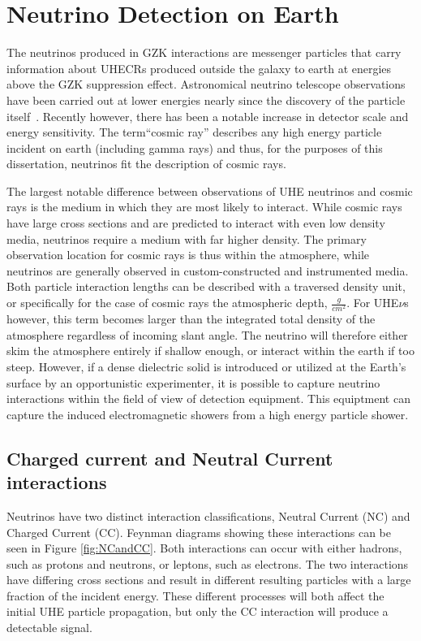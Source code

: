 \section{Neutrino Detection on Earth}
	The neutrinos produced in GZK interactions are messenger particles that carry information about UHECRs produced outside the galaxy to earth at energies above the GZK suppression effect.  Astronomical neutrino telescope observations have been carried out at lower energies nearly since the discovery of the particle itself~\cite{Homestake}. Recently however, there has been a notable increase in detector scale and energy sensitivity.  The term``cosmic ray'' describes any high energy particle incident on earth (including gamma rays) and thus, for the purposes of this dissertation, neutrinos fit the description of cosmic rays.
	
	The largest notable difference between observations of UHE neutrinos and cosmic rays is the medium in which they are most likely to interact.  While cosmic rays have large cross sections and are predicted to interact with even low density media, neutrinos require a medium with far higher density.  The primary observation location for cosmic rays is thus within the atmosphere, while neutrinos are generally observed in custom-constructed and instrumented media.  Both particle interaction lengths can be described with a traversed density unit, or specifically for the case of cosmic rays the atmospheric depth, $\frac{g}{cm^{2}}$.  For UHE$\nu$s however, this term becomes larger than the integrated total density of the atmosphere regardless of incoming slant angle.  The neutrino will therefore either skim the atmosphere entirely if shallow enough, or interact within the earth if too steep.  However, if a dense dielectric solid is introduced or utilized at the Earth's surface by an opportunistic experimenter, it is possible to capture neutrino interactions within the field of view of detection equipment.  This equiptment can capture the induced electromagnetic showers from a high energy particle shower.
	
	\subsection{Charged current and Neutral Current interactions} 
		Neutrinos have two distinct interaction classifications, Neutral Current (NC) and Charged Current (CC).  Feynman diagrams showing these interactions can be seen in Figure \ref{fig:NCandCC}.  Both interactions can occur with either hadrons, such as protons and neutrons, or leptons, such as electrons.  The two interactions have differing cross sections and result in different resulting particles with a large fraction of the incident energy.  These different processes will both affect the initial UHE particle propagation, but only the CC interaction will produce a detectable signal.
		
